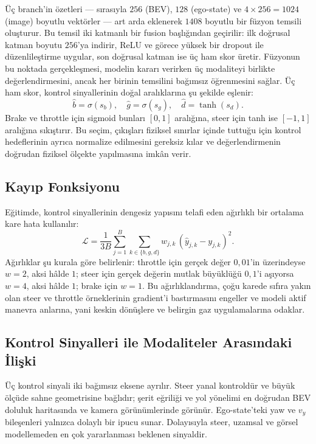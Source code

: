 \documentclass[conference]{IEEEtran}
\begin{document}
Üç branch'in özetleri --- sırasıyla $256$ (BEV), $128$ (ego-state) ve $4{\times}256{=}1024$ (image) boyutlu vektörler --- art arda eklenerek $1408$ boyutlu bir füzyon temsili oluşturur. Bu temsil iki katmanlı bir fusion başlığından geçirilir: ilk doğrusal katman boyutu $256$'ya indirir, ReLU ve görece yüksek bir dropout ile düzenlileştirme uygular, son doğrusal katman ise üç ham skor üretir. Füzyonun bu noktada gerçekleşmesi, modelin kararı verirken üç modaliteyi birlikte değerlendirmesini, ancak her birinin temsilini bağımsız öğrenmesini sağlar. Üç ham skor, kontrol sinyallerinin doğal aralıklarına şu şekilde eşlenir:
\begin{equation}
\hat{b} = \sigma(s_b),\quad \hat{g} = \sigma(s_g),\quad \hat{d} = \tanh(s_d).
\end{equation}
Brake ve throttle için sigmoid bunları $[0,1]$ aralığına, steer için tanh ise $[-1,1]$ aralığına sıkıştırır. Bu seçim, çıkışları fiziksel sınırlar içinde tuttuğu için kontrol hedeflerinin ayrıca normalize edilmesini gereksiz kılar ve değerlendirmenin doğrudan fiziksel ölçekte yapılmasına imkân verir.

\subsection{Kayıp Fonksiyonu}

Eğitimde, kontrol sinyallerinin dengesiz yapısını telafi eden ağırlıklı bir ortalama kare hata kullanılır:
\begin{equation}
\mathcal{L} = \frac{1}{3B}\sum_{j=1}^{B}\sum_{k\in\{b,g,d\}} w_{j,k}\,(\hat{y}_{j,k}-y_{j,k})^2.
\end{equation}
Ağırlıklar şu kurala göre belirlenir: throttle için gerçek değer $0{,}01$'in üzerindeyse $w=2$, aksi hâlde $1$; steer için gerçek değerin mutlak büyüklüğü $0{,}1$'i aşıyorsa $w=4$, aksi hâlde $1$; brake için $w=1$. Bu ağırlıklandırma, çoğu karede sıfıra yakın olan steer ve throttle örneklerinin gradient'i bastırmasını engeller ve modeli aktif manevra anlarına, yani keskin dönüşlere ve belirgin gaz uygulamalarına odaklar.

\subsection{Kontrol Sinyalleri ile Modaliteler Arasındaki İlişki}
\label{sec:relation}

Üç kontrol sinyali iki bağımsız eksene ayrılır. Steer yanal kontroldür ve büyük ölçüde sahne geometrisine bağlıdır; şerit eğriliği ve yol yönelimi en doğrudan BEV doluluk haritasında ve kamera görünümlerinde görünür. Ego-state'teki yaw ve $v_y$ bileşenleri yalnızca dolaylı bir ipucu sunar. Dolayısıyla steer, uzamsal ve görsel modellemeden en çok yararlanması beklenen sinyaldir.
\end{document}
